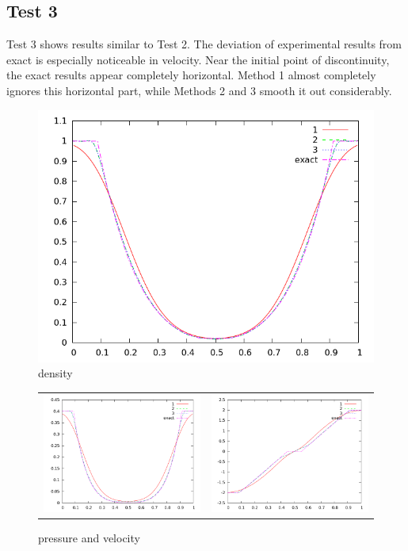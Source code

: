 \documentclass[letterpaper,12pt]{article}
\begin{document}
\clearpage

\subsection{Test 3}
Test 3 shows results similar to Test 2. The deviation of experimental results from exact is especially noticeable in velocity. Near the initial point of discontinuity, the exact results appear completely horizontal. Method 1 almost completely ignores this horizontal part, while Methods 2 and 3 smooth it out considerably. 
\begin{figure}[h]
  \begin{center}
     \includegraphics[width=.78\textwidth]{den_T3.png}	
  \end{center}
  \caption{density}
\end{figure}

\begin{figure}
  \begin{center}
	\begin{tabular}{cc}
      \includegraphics[width=.425\textwidth]{prs_T3.png} &
	  \includegraphics[width=.425\textwidth]{vel_T3.png}
	\end{tabular}
  \end{center}
  \caption{pressure and velocity}
\end{figure}
\end{document}
